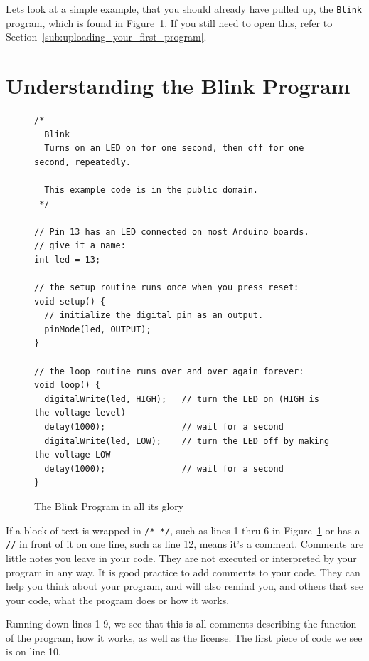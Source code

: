 \documentclass[11pt,a4paper]{article}
\begin{document}
Lets look at a simple example, that you should already have pulled up, the \texttt{Blink} program, which is found in Figure~\ref{fig:blink}.  If you still need to open this, refer to Section~\ref{sub:uploading_your_first_program}.



\section{Understanding the Blink Program} %
\label{sec:understanding_the_blink_program}

\begin{figure}[htbp]
	\centering
\begin{verbatim}
/*
  Blink
  Turns on an LED on for one second, then off for one second, repeatedly.
 
  This example code is in the public domain.
 */
 
// Pin 13 has an LED connected on most Arduino boards.
// give it a name:
int led = 13;

// the setup routine runs once when you press reset:
void setup() {                
  // initialize the digital pin as an output.
  pinMode(led, OUTPUT);     
}

// the loop routine runs over and over again forever:
void loop() {
  digitalWrite(led, HIGH);   // turn the LED on (HIGH is the voltage level)
  delay(1000);               // wait for a second
  digitalWrite(led, LOW);    // turn the LED off by making the voltage LOW
  delay(1000);               // wait for a second
}
\end{verbatim}
	\caption{The Blink Program in all its glory}
	\label{fig:blink}
\end{figure}

If a block of text is wrapped in \texttt{/* */}, such as lines 1 thru 6 in Figure~\ref{fig:blink} or has a \texttt{//} in front of it on one line, such as line 12, means it's a comment.  Comments are little notes you leave in your code.   They are not executed or interpreted by your program in any way.  It is good practice to add comments to your code.  They can help you think about your program, and will also remind you, and others that see your code, what the program does or how it works.

Running down lines 1-9, we see that this is all comments describing the function of the program, how it works, as well as the license.   The first piece of code we see is on line 10.
\end{document}
